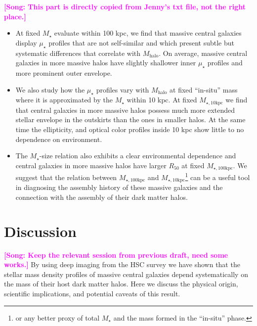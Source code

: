 \documentclass[a4paper,fleqn,usenatbib]{mnras}
\def\mstar{{$M_{\star}$}}
\def\mhalo{{$M_{\mathrm{halo}}$}}
\def\minn{{$M_{\star,10\mathrm{kpc}}$}}
\def\mtot{{$M_{\star,100\mathrm{kpc}}$}}
\def\mden{{$\mu_{\star}$}}
\newcommand{\song}[1]{\textcolor{magenta}{\textbf{[Song: #1]}}}
\begin{document}
   \song{This part is directly copied from Jenny's txt file, not the right place.}    
   \begin{itemize}
   
         \item At fixed \mstar{} evaluate within 100 kpc, we find that massive central 
            galaxies display \mden{} profiles that are not self-similar and which 
            present subtle but systematic differences that correlate with \mhalo{}.
            On average, massive central galaxies in more massive halos have slightly 
            shallower inner \mden{} profiles and more prominent outer envelope.
            
        \item We also study how the \mden{} profiles vary with \mhalo{} at fixed 
            ``in-situ'' mass where it is approximated by the \mstar{} within 10 kpc. 
            At fixed \minn{} we find that central galaxies in more massive halos 
            possess much more extended stellar envelope in the outskirts than the ones 
            in smaller halos. 
            At the same time the ellipticity, and optical color profiles inside 10 kpc 
            show little to no dependence on environment.
        
        \item The \mstar{}-size relation also exhibits a clear environmental 
            dependence and central galaxies in more massive halos have larger 
            $R_{\mathrm{50}}$ at fixed \mtot{}. 
            We suggest that the relation between \mtot{} and \minn{}\footnote{or any 
            better proxy of total \mstar{} and the mass formed in the ``in-situ'' phase.} 
            can be a useful tool in diagnosing the assembly history of these massive 
            galaxies and the connection with the assembly of their dark matter halos.
  
   \end{itemize}


\section{Discussion}
    \label{sec:discussion}
    
    \song{Keep the relevant session from previous draft, need some works.}
    By using deep imaging from the HSC survey we have shown that the stellar mass 
    density profiles of massive central galaxies depend systematically on the mass 
    of their host dark matter halos. 
    Here we discuss the physical origin, scientific implications, and potential 
    caveats of this result. 
    
\end{document}
